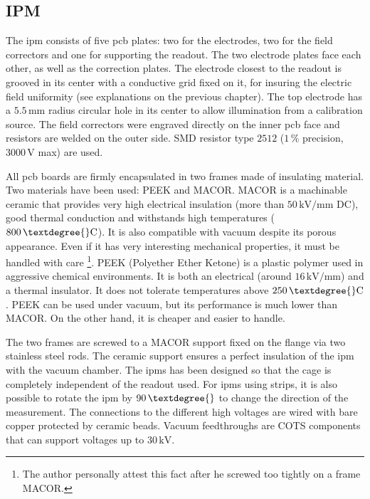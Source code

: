 \begin{refsection}
  \subsection{IPM}
  The \acrshort{ipm} consists of five \acrshort{pcb} plates: two for the electrodes, two for the field correctors and one for supporting the readout. The two electrode plates face each other, as well as the correction plates. The electrode closest to the readout is grooved in its center with a conductive grid fixed on it, for insuring the electric field uniformity (see explanations on the previous chapter). The top electrode has a $5.5\,\mathrm{mm}$ radius circular hole in its center to allow illumination from a calibration source. The field correctors were engraved directly on the inner \acrshort{pcb} face and resistors are welded on the outer side. SMD resistor type $2512$ ($1\,\mathrm{\%}$ precision, $3000\,\mathrm{V}$ max) are used.

  All \acrshort{pcb} boards are firmly encapsulated in two frames made of insulating material. Two materials have been used: PEEK and MACOR. MACOR is a machinable ceramic that provides very high electrical insulation (more than $50\,\mathrm{kV/mm}$ DC), good thermal conduction and withstands high temperatures ($800\,\mathrm{\textdegree{}C}$). It is also compatible with vacuum despite its porous appearance. Even if it has very interesting mechanical properties, it must be handled with care \footnote{The author personally attest this fact after he screwed too tightly on a frame MACOR.}. PEEK (Polyether Ether Ketone) is a plastic polymer used in aggressive chemical environments. It is both an electrical (around $16\,\mathrm{kV/mm}$) and a thermal insulator. It does not tolerate temperatures above $250\,\mathrm{\textdegree{}C}$. PEEK can be used under vacuum, but its performance is much lower than MACOR. On the other hand, it is cheaper and easier to handle.

  The two frames are screwed to a MACOR support fixed on the flange via two stainless steel rods. The ceramic support ensures a perfect insulation of the \acrshort{ipm} with the vacuum chamber. The \acrshort{ipm}s has been designed so that the cage is completely independent of the readout used. For \acrshort{ipm}s using strips, it is also possible to rotate the \acrshort{ipm} by $90\,\textdegree{}$ to change the direction of the measurement. The connections to the different high voltages are wired with bare copper protected by ceramic beads. Vacuum feedthroughs are COTS components that can support voltages up to $30\,\mathrm{kV}$.


\end{refsection}
